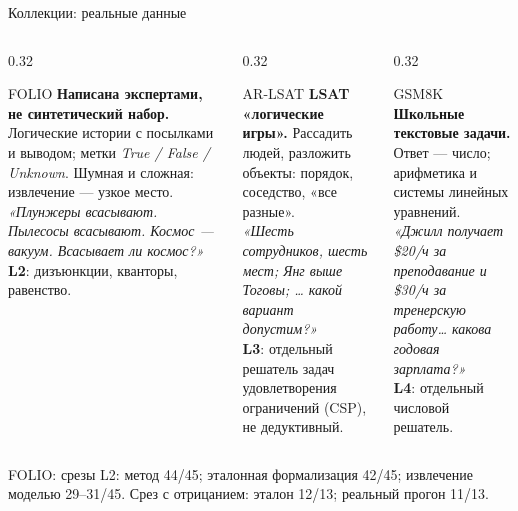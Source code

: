 \documentclass[aspectratio=169,11pt]{beamer}
\newcommand{\Prov}[1]{\textcolor{provencolor}{#1}}
\begin{document}
\begin{frame}[shrink=6]{Коллекции: реальные данные}
  \footnotesize
  \begin{columns}[T,onlytextwidth]
    \begin{column}{0.32\textwidth}
      \begin{block}{FOLIO}
        \textbf{Написана экспертами, не синтетический набор.} Логические истории
        с посылками и выводом; метки \textit{True / False / Unknown}.
        Шумная и сложная: извлечение — узкое место.\\
        \textit{«Плунжеры всасывают. Пылесосы всасывают. Космос — вакуум.
        Всасывает ли космос?»}\\[1mm]
        \textbf{L2}: дизъюнкции, кванторы, равенство.
      \end{block}
    \end{column}
    \begin{column}{0.32\textwidth}
      \begin{block}{AR-LSAT}
        \textbf{LSAT «логические игры».} Рассадить людей, разложить
        объекты: порядок, соседство, «все разные».\\
        \textit{«Шесть сотрудников, шесть мест; Янг выше Тоговы; …
        какой вариант допустим?»}\\[1mm]
        \textbf{L3}: отдельный решатель задач удовлетворения ограничений
        (CSP), не дедуктивный.
      \end{block}
    \end{column}
    \begin{column}{0.32\textwidth}
      \begin{block}{GSM8K}
        \textbf{Школьные текстовые задачи.} Ответ — число; арифметика
        и системы линейных уравнений.\\
        \textit{«Джилл получает \$20/ч за преподавание и \$30/ч за
        тренерскую работу… какова годовая зарплата?»}\\[1mm]
        \textbf{L4}: отдельный числовой решатель.
      \end{block}
    \end{column}
  \end{columns}

  \vspace{1mm}
  \begin{block}{FOLIO: срезы}
    L2: метод \Prov{44/45}; эталонная формализация \Prov{42/45};
    извлечение моделью 29--31/45.\quad
    Срез с отрицанием: эталон \Prov{12/13}; реальный прогон \Prov{11/13}.
  \end{block}
\end{frame}
\end{document}
